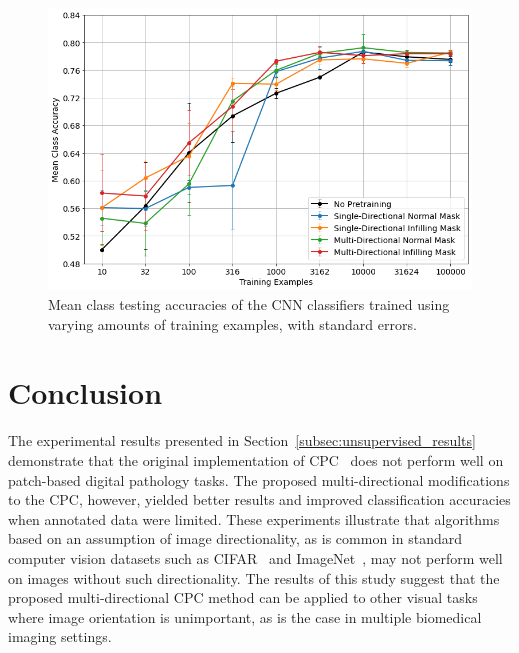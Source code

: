 \begin{figure}[h]
	\centering
	\includegraphics[width=\textwidth]{images/cpc_cnn_results.png}
	\caption{Mean class testing accuracies of the CNN classifiers trained using varying amounts of training examples, with standard errors.}
	\label{fig:cpc_cnn_results}
\end{figure}



\section{Conclusion}
\label{sec:conclusion}
The experimental results presented in Section~\ref{subsec:unsupervised_results} demonstrate that the original implementation of CPC~\citep{oord2018representation} does not perform well on patch-based digital pathology tasks. The proposed multi-directional modifications to the CPC, however, yielded better results and improved classification accuracies when annotated data were limited. These experiments illustrate that algorithms based on an assumption of image directionality, as is common in standard computer vision datasets such as CIFAR~\citep{krizhevsky2009learning} and ImageNet~\citep{deng2009imagenet}, may not perform well on images without such directionality. The results of this study suggest that the proposed multi-directional CPC method can be applied to other visual tasks where image orientation is unimportant, as is the case in multiple biomedical imaging settings.
